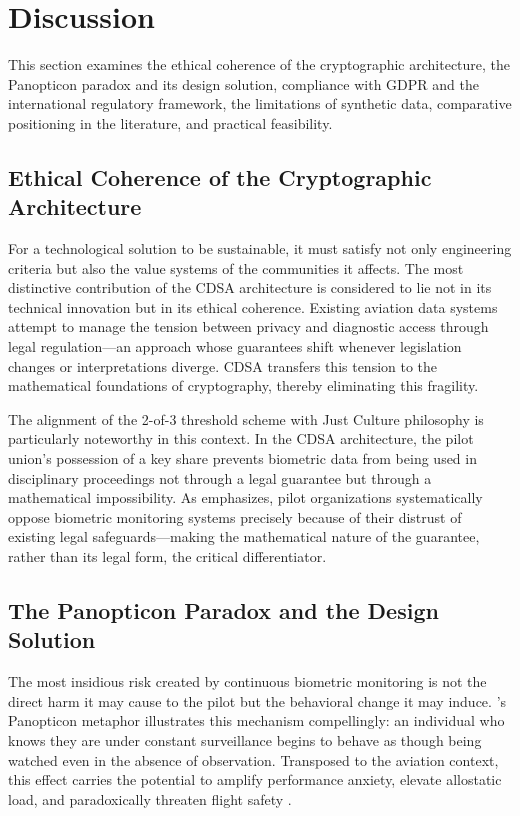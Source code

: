 \documentclass[12pt,a4paper]{article}
\begin{document}
\section{Discussion}
\label{sec:discussion}

This section examines the ethical coherence of the cryptographic architecture, the Panopticon
paradox and its design solution, compliance with GDPR and the international regulatory
framework, the limitations of synthetic data, comparative positioning in the literature,
and practical feasibility.

\subsection{Ethical Coherence of the Cryptographic Architecture}

For a technological solution to be sustainable, it must satisfy not only engineering criteria
but also the value systems of the communities it affects. The most distinctive contribution of
the CDSA architecture is considered to lie not in its technical innovation but in its ethical
coherence. Existing aviation data systems attempt to manage the tension between privacy and
diagnostic access through legal regulation---an approach whose guarantees shift whenever
legislation changes or interpretations diverge. CDSA transfers this tension to the mathematical
foundations of cryptography, thereby eliminating this fragility.

The alignment of the 2-of-3 threshold scheme with Just Culture philosophy is particularly
noteworthy in this context. In the CDSA architecture, the pilot union's possession of a key
share prevents biometric data from being used in disciplinary proceedings not through a legal
guarantee but through a mathematical impossibility. As \citet{alpa2022} emphasizes, pilot
organizations systematically oppose biometric monitoring systems precisely because of their
distrust of existing legal safeguards---making the mathematical nature of the guarantee, rather
than its legal form, the critical differentiator.

\subsection{The Panopticon Paradox and the Design Solution}

The most insidious risk created by continuous biometric monitoring is not the direct harm it
may cause to the pilot but the behavioral change it may induce. \citeauthor{foucault1992}'s
\citeyearpar{foucault1992} Panopticon metaphor illustrates this mechanism compellingly: an
individual who knows they are under constant surveillance begins to behave as though being
watched even in the absence of observation. Transposed to the aviation context, this effect
carries the potential to amplify performance anxiety, elevate allostatic load, and paradoxically
threaten flight safety \citep{zuboff2019}.
\end{document}
